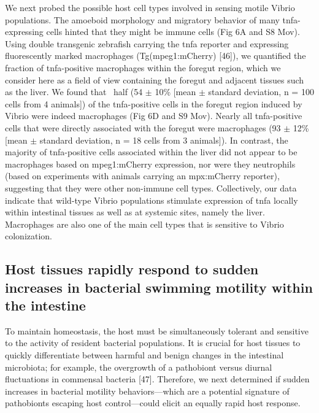 We next probed the possible host cell types involved in sensing motile Vibrio populations. The amoeboid morphology and migratory behavior of many tnfa-expressing cells hinted that they might be immune cells (Fig 6A and S8 Mov). Using double transgenic zebrafish carrying the tnfa reporter and expressing fluorescently marked macrophages (Tg(mpeg1:mCherry) [46]), we quantified the fraction of tnfa-positive macrophages within the foregut region, which we consider here as a field of view containing the foregut and adjacent tissues such as the liver. We found that ~half (54 $\pm$ 10\% [mean $\pm$ standard deviation, n = 100 cells from 4 animals]) of the tnfa-positive cells in the foregut region induced by Vibrio were indeed macrophages (Fig 6D and S9 Mov). Nearly all tnfa-positive cells that were directly associated with the foregut were macrophages (93 $\pm$ 12\% [mean $\pm$ standard deviation, n = 18 cells from 3 animals]). In contrast, the majority of tnfa-positive cells associated within the liver did not appear to be macrophages based on mpeg1:mCherry expression, nor were they neutrophils (based on experiments with animals carrying an mpx:mCherry reporter), suggesting that they were other non-immune cell types. Collectively, our data indicate that wild-type Vibrio populations stimulate expression of tnfa locally within intestinal tissues as well as at systemic sites, namely the liver. Macrophages are also one of the main cell types that is sensitive to Vibrio colonization.


\subsection{Host tissues rapidly respond to sudden increases in bacterial swimming motility within the intestine} 
To maintain homeostasis, the host must be simultaneously tolerant and sensitive to the activity of resident bacterial populations. It is crucial for host tissues to quickly differentiate between harmful and benign changes in the intestinal microbiota; for example, the overgrowth of a pathobiont versus diurnal fluctuations in commensal bacteria [47]. Therefore, we next determined if sudden increases in bacterial motility behaviors—which are a potential signature of pathobionts escaping host control—could elicit an equally rapid host response. 

